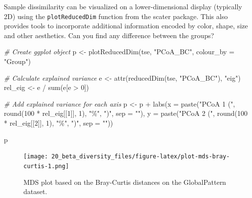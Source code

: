 \documentclass[
]{book}
\newenvironment{Shaded}{\begin{snugshade}}{\end{snugshade}}
\newcommand{\AttributeTok}[1]{\textcolor[rgb]{0.77,0.63,0.00}{#1}}
\newcommand{\CommentTok}[1]{\textcolor[rgb]{0.56,0.35,0.01}{\textit{#1}}}
\newcommand{\DecValTok}[1]{\textcolor[rgb]{0.00,0.00,0.81}{#1}}
\newcommand{\FunctionTok}[1]{\textcolor[rgb]{0.00,0.00,0.00}{#1}}
\newcommand{\NormalTok}[1]{#1}
\newcommand{\OtherTok}[1]{\textcolor[rgb]{0.56,0.35,0.01}{#1}}
\newcommand{\SpecialCharTok}[1]{\textcolor[rgb]{0.00,0.00,0.00}{#1}}
\newcommand{\StringTok}[1]{\textcolor[rgb]{0.31,0.60,0.02}{#1}}
\begin{document}
Sample dissimilarity can be visualized on a lower-dimensional display (typically
2D) using the \texttt{plotReducedDim} function from the scater package. This also
provides tools to incorporate additional information encoded by color, shape,
size and other aesthetics. Can you find any difference between the groups?

\begin{Shaded}
\begin{Highlighting}[]
\CommentTok{\# Create ggplot object}
\NormalTok{p }\OtherTok{\textless{}{-}} \FunctionTok{plotReducedDim}\NormalTok{(tse, }\StringTok{"PCoA\_BC"}\NormalTok{,}
                    \AttributeTok{colour\_by =} \StringTok{"Group"}\NormalTok{)}

\CommentTok{\# Calculate explained variance}
\NormalTok{e }\OtherTok{\textless{}{-}} \FunctionTok{attr}\NormalTok{(}\FunctionTok{reducedDim}\NormalTok{(tse, }\StringTok{"PCoA\_BC"}\NormalTok{), }\StringTok{"eig"}\NormalTok{)}
\NormalTok{rel\_eig }\OtherTok{\textless{}{-}}\NormalTok{ e }\SpecialCharTok{/} \FunctionTok{sum}\NormalTok{(e[e }\SpecialCharTok{\textgreater{}} \DecValTok{0}\NormalTok{])}

\CommentTok{\# Add explained variance for each axis}
\NormalTok{p }\OtherTok{\textless{}{-}}\NormalTok{ p }\SpecialCharTok{+} \FunctionTok{labs}\NormalTok{(}\AttributeTok{x =} \FunctionTok{paste}\NormalTok{(}\StringTok{"PCoA 1 ("}\NormalTok{, }\FunctionTok{round}\NormalTok{(}\DecValTok{100} \SpecialCharTok{*}\NormalTok{ rel\_eig[[}\DecValTok{1}\NormalTok{]], }\DecValTok{1}\NormalTok{), }\StringTok{"\%"}\NormalTok{, }\StringTok{")"}\NormalTok{, }\AttributeTok{sep =} \StringTok{""}\NormalTok{),}
              \AttributeTok{y =} \FunctionTok{paste}\NormalTok{(}\StringTok{"PCoA 2 ("}\NormalTok{, }\FunctionTok{round}\NormalTok{(}\DecValTok{100} \SpecialCharTok{*}\NormalTok{ rel\_eig[[}\DecValTok{2}\NormalTok{]], }\DecValTok{1}\NormalTok{), }\StringTok{"\%"}\NormalTok{, }\StringTok{")"}\NormalTok{, }\AttributeTok{sep =} \StringTok{""}\NormalTok{))}

\NormalTok{p}
\end{Highlighting}
\end{Shaded}

\begin{figure}
\centering
\texttt{[image: 20\_beta\_diversity\_files/figure-latex/plot-mds-bray-curtis-1.png]}
\caption{\label{fig:plot-mds-bray-curtis}MDS plot based on the Bray-Curtis distances on the GlobalPattern dataset.}
\end{figure}
\end{document}
